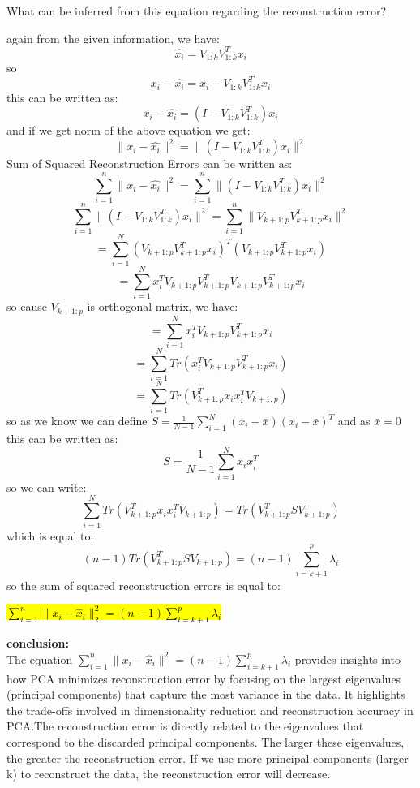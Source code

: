 What can be inferred from this equation regarding the reconstruction error?
\begin{qsolve}
    \begin{qsolve}[]
        again from the given information, we have:
        \[
        \hat{x_i} = V_{1:k}V_{1:k}^Tx_i
        \]
        so
        \[
        x_i - \hat{x_i} = x_i - V_{1:k}V_{1:k}^Tx_i
        \]
        this can be written as:
        \[
        x_i - \hat{x_i} = (I - V_{1:k}V_{1:k}^T)x_i
        \]
        and if we get norm of the above equation we get:
        \[
        \|x_i - \hat{x_i}\|^2 = \|(I - V_{1:k}V_{1:k}^T)x_i\|^2
        \]
        Sum of Squared Reconstruction Errors can be written as:
        \[
        \sum_{i=1}^{n}\|x_i - \hat{x_i}\|^2 = \sum_{i=1}^{n}\|(I - V_{1:k}V_{1:k}^T)x_i\|^2
        \]
        $$ \sum_{i=1}^{n}\|(I - V_{1:k}V_{1:k}^T)x_i\|^2 = \sum_{i=1}^{n}\|V_{k+1:p}V_{k+1:p}^Tx_i\|^2 $$
        $$ = \sum_{i=1}^{N}(V_{k+1:p}V_{k+1:p}^T x_i)^T(V_{k+1:p}V_{k+1:p}^T x_i) $$
        $$ = \sum_{i=1}^{N}x_i^T V_{k+1:p}V_{k+1:p}^T V_{k+1:p}V_{k+1:p}^T x_i $$
        so cause $V_{k+1:p}$ is orthogonal matrix, we have:
        $$ = \sum_{i=1}^{N}x_i^T V_{k+1:p}V_{k+1:p}^T x_i $$
        $$ = \sum_{i=1}^{N}Tr(x_i^T V_{k+1:p}V_{k+1:p}^T x_i) $$
        $$ = \sum_{i=1}^{N}Tr(V_{k+1:p}^T x_i x_i^T V_{k+1:p}) $$
        so as we know we can define $S = \frac{1}{N-1}\sum_{i=1}^{N}(x_i-\bar{x})(x_i-\bar{x})^T$ and as $\bar{x} = 0$ this can be written as:
        $$ S = \frac{1}{N-1}\sum_{i=1}^{N}x_i x_i^T $$
        so we can write:
        $$ \sum_{i=1}^{N}Tr(V_{k+1:p}^T x_i x_i^T V_{k+1:p}) = Tr(V_{k+1:p}^T S V_{k+1:p}) $$
        \splitqsolve[\splitqsolve]
        which is equal to:
        $$ (n-1)Tr(V_{k+1:p}^T S V_{k+1:p}) = (n-1)\sum_{i=k+1}^{p}\lambda_i $$
        so the sum of squared reconstruction errors is equal to:
        \begin{center}
            \hl{$ \sum_{i=1}^n \| x_i - \hat{x}_i \|_2^2 = (n - 1) \sum_{i=k+1}^p \lambda_i$}
        \end{center}
        \textbf{conclusion:}\\
        The equation
        $
        \sum_{i=1}^{n} \|x_i - \hat{x}_i\|^2 = (n-1) \sum_{i=k+1}^{p} \lambda_i
        $
        provides insights into how PCA minimizes reconstruction error by focusing on the largest eigenvalues (principal components) that capture the most variance in the data. It highlights the trade-offs involved in dimensionality reduction and reconstruction accuracy in PCA.The reconstruction error is directly related to
        the eigenvalues that correspond to the discarded principal components. The larger these
        eigenvalues, the greater the reconstruction error. If we use more principal components (larger k) to reconstruct the data, the reconstruction error will decrease.
    \end{qsolve}
\end{qsolve}